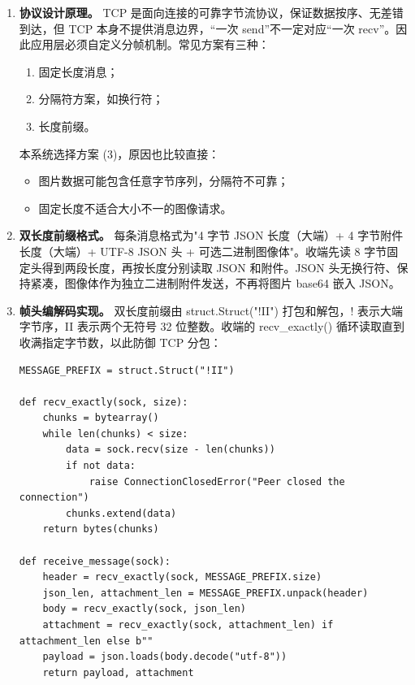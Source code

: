 \documentclass[12pt]{article}
\newcommand{\code}[1]{{\ttfamily #1}}
\begin{document}
\begin{enumerate}
	\item \textbf{协议设计原理。} TCP 是面向连接的可靠字节流协议，保证数据按序、无差错到达，但 TCP 本身不提供消息边界，“一次 send”不一定对应“一次 recv”。因此应用层必须自定义分帧机制。常见方案有三种：

	      \begin{enumerate}
		      \item 固定长度消息；
		      \item 分隔符方案，如换行符；
		      \item 长度前缀。
	      \end{enumerate}

	      本系统选择方案 (3)，原因也比较直接：

	      \begin{itemize}
		      \item 图片数据可能包含任意字节序列，分隔符不可靠；
		      \item 固定长度不适合大小不一的图像请求。
	      \end{itemize}

	\item \textbf{双长度前缀格式。} 每条消息格式为"4 字节 JSON 长度（大端）+ 4 字节附件长度（大端）+ UTF-8 JSON 头 + 可选二进制图像体"。收端先读 8 字节固定头得到两段长度，再按长度分别读取 JSON 和附件。JSON 头无换行符、保持紧凑，图像体作为独立二进制附件发送，不再将图片 \code{base64} 嵌入 JSON。

	\item \textbf{帧头编解码实现。} 双长度前缀由 \code{struct.Struct("!II")} 打包和解包，\code{!} 表示大端字节序，\code{II} 表示两个无符号 32 位整数。收端的 \code{recv\_exactly()} 循环读取直到收满指定字节数，以此防御 TCP 分包：

	      \begin{lstlisting}[caption={TCP 消息收发（两端共用的 \code{tcp\_protocol.py}）},label={lst:tcp-protocol}]
MESSAGE_PREFIX = struct.Struct("!II")

def recv_exactly(sock, size):
    chunks = bytearray()
    while len(chunks) < size:
        data = sock.recv(size - len(chunks))
        if not data:
            raise ConnectionClosedError("Peer closed the connection")
        chunks.extend(data)
    return bytes(chunks)

def receive_message(sock):
    header = recv_exactly(sock, MESSAGE_PREFIX.size)
    json_len, attachment_len = MESSAGE_PREFIX.unpack(header)
    body = recv_exactly(sock, json_len)
    attachment = recv_exactly(sock, attachment_len) if attachment_len else b""
    payload = json.loads(body.decode("utf-8"))
    return payload, attachment


\end{lstlisting}
\end{enumerate}
\end{document}
